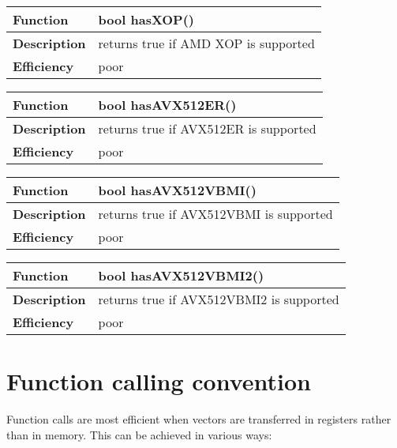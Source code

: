 \documentclass[vcl_manual.tex]{subfiles}
\begin{document}
\begin{tabular}{|p{25mm}|p{100mm}|}
\hline
\bfseries Function & bool hasXOP() \\ \hline
\bfseries Description & returns true if AMD XOP is supported \\ \hline
 \bfseries Efficiency & poor \\ \hline
\end{tabular}


\begin{tabular}{|p{25mm}|p{100mm}|}
\hline
\bfseries Function & bool hasAVX512ER() \\ \hline
\bfseries Description & returns true if AVX512ER is supported \\ \hline
 \bfseries Efficiency & poor \\ \hline
\end{tabular}

\begin{tabular}{|p{25mm}|p{100mm}|}
\hline
\bfseries Function & bool hasAVX512VBMI() \\ \hline
\bfseries Description & returns true if AVX512VBMI is supported \\ \hline
 \bfseries Efficiency & poor \\ \hline
\end{tabular}

\begin{tabular}{|p{25mm}|p{100mm}|}
\hline
\bfseries Function & bool hasAVX512VBMI2() \\ \hline
\bfseries Description & returns true if AVX512VBMI2 is supported \\ \hline
 \bfseries Efficiency & poor \\ \hline
\end{tabular}


\section{Function calling convention}\label{FunctionCallingConvention}
Function calls are most efficient when vectors are transferred in registers rather than in memory. This can be achieved in various ways:
\end{document}

